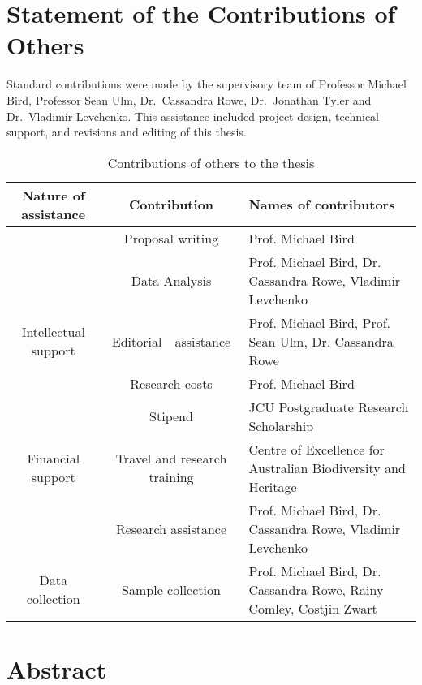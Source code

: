 \documentclass[
  12pt,
]{book}
\begin{document}
\hypertarget{statement-of-the-contributions-of-others}{%
\chapter*{Statement of the Contributions of Others}\label{statement-of-the-contributions-of-others}}

Standard contributions were made by the supervisory team of Professor Michael Bird, Professor Sean Ulm, Dr.~Cassandra Rowe, Dr.~Jonathan Tyler and Dr.~Vladimir Levchenko. This assistance included project design, technical support, and revisions and editing of this thesis.

\begin{table}

\caption{\label{tab:st3}Contributions of others to the thesis}
\centering
\begin{tabular}[t]{cc>{\centering\arraybackslash}p{5cm}}
\toprule
Nature of assistance & Contribution & Names of contributors\\
\midrule
 & Proposal writing & Prof. Michael Bird\\
\cmidrule{2-3}
 & Data Analysis & Prof. Michael Bird, Dr. Cassandra Rowe, Vladimir Levchenko\\
\cmidrule{2-3}
\multirow{-3}{*}{\centering\arraybackslash Intellectual support} & Editorial  assistance & Prof. Michael Bird, Prof.  Sean Ulm, Dr. Cassandra Rowe\\
\cmidrule{1-3}
 & Research costs & Prof. Michael Bird\\
\cmidrule{2-3}
 & Stipend & JCU Postgraduate Research Scholarship\\
\cmidrule{2-3}
\multirow{-3}{*}{\centering\arraybackslash Financial support} & Travel and research training & Centre of Excellence for Australian Biodiversity and Heritage\\
\cmidrule{1-3}
 & Research assistance & Prof. Michael Bird, Dr. Cassandra Rowe, Vladimir Levchenko\\
\cmidrule{2-3}
\multirow{-2}{*}{\centering\arraybackslash Data collection} & Sample collection & Prof. Michael Bird, Dr. Cassandra Rowe, Rainy Comley, Costjin Zwart\\
\bottomrule
\end{tabular}
\end{table}



\hypertarget{abstract}{%
\chapter*{Abstract}\label{abstract}}
\end{document}
